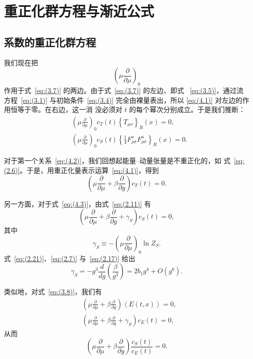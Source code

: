 \section{重正化群方程与渐近公式}
\label{sec:4}
\subsection{系数的重正化群方程}
\label{sec:4.1}
我们现在把
\begin{equation}
   \left(\mu\frac{\partial}{\partial\mu}\right)_0
\label{eq:(4.1)}
\end{equation}
作用于式~\eqref{eq:(3.7)} 的两边。由于式~\eqref{eq:(3.7)} 的左边、即式%
~\eqref{eq:(3.5)}，通过流方程~\eqref{eq:(3.1)} 与初始条件~\eqref{eq:(3.4)}
完全由裸量表出，所以 \eqref{eq:(4.1)} 对左边的作用恒等于零。在右边，这一消
没必须对 $t$ 的每个幂次分别成立。于是我们推断：
\begin{align}
   &\left(\mu\frac{\partial}{\partial\mu}\right)_0c_T(t)
   \left\{T_{\mu\nu}\right\}_R(x)=0,
\label{eq:(4.2)}
\\
   &\left(\mu\frac{\partial}{\partial\mu}\right)_0c_S(t)
   \left\{\frac{1}{4}F_{\rho\sigma}^aF_{\rho\sigma}^a\right\}_R(x)=0.
\label{eq:(4.3)}
\end{align}

对于第一个关系~\eqref{eq:(4.2)}，我们回想起能量--动量张量是不重正化的，如
式~\eqref{eq:(2.6)}。于是，用重正化量表示运算~\eqref{eq:(4.1)}，得到
\begin{equation}
   \left(\mu\frac{\partial}{\partial\mu}
   +\beta\frac{\partial}{\partial g}\right)c_T(t)=0.
\label{eq:(4.4)}
\end{equation}

另一方面，对于式~\eqref{eq:(4.3)}，由式~\eqref{eq:(2.11)} 有
\begin{equation}
   \left(\mu\frac{\partial}{\partial\mu}
   +\beta\frac{\partial}{\partial g}
   +\gamma_S\right)c_S(t)=0,
\label{eq:(4.5)}
\end{equation}
其中
\begin{equation}
   \gamma_S
   \equiv-\left(\mu\frac{\partial}{\partial\mu}\right)_0\ln Z_S.
\label{eq:(4.6)}
\end{equation}
式~\eqref{eq:(2.21)}、\eqref{eq:(2.7)} 与~\eqref{eq:(2.17)} 给出
\begin{equation}
   \gamma_S=-g^3\frac{d}{dg}\left(\frac{\beta}{g^3}\right)
   =2b_1g^4+O(g^6).
\label{eq:(4.7)}
\end{equation}

类似地，对式~\eqref{eq:(3.8)}，我们有
\begin{align}
   &\left(\mu\frac{\partial}{\partial\mu}
   +\beta\frac{\partial}{\partial g}\right)
   \left\langle E(t,x)\right\rangle=0,
\label{eq:(4.8)}
\\
   &\left(\mu\frac{\partial}{\partial\mu}
   +\beta\frac{\partial}{\partial g}
   +\gamma_S\right)c_E(t)=0,
\label{eq:(4.9)}
\end{align}
从而
\begin{equation}
   \left(\mu\frac{\partial}{\partial\mu}
   +\beta\frac{\partial}{\partial g}\right)\frac{c_S(t)}{c_E(t)}=0.
\label{eq:(4.10)}
\end{equation}

